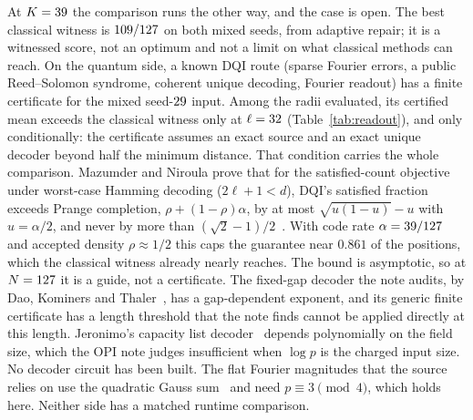 \documentclass[10pt]{article}
\begin{document}
At $K=39$ the comparison runs the other way, and the case is open. The best classical witness is $109/127$ on both mixed seeds, from adaptive repair; it is a witnessed score, not an optimum and not a limit on what classical methods can reach. On the quantum side, a known DQI route (sparse Fourier errors, a public Reed--Solomon syndrome, coherent unique decoding, Fourier readout) has a finite certificate for the mixed seed-$29$ input. Among the radii evaluated, its certified mean exceeds the classical witness only at $\ell=32$ (Table~\ref{tab:readout}), and only conditionally: the certificate assumes an exact source and an exact unique decoder beyond half the minimum distance. That condition carries the whole comparison. Mazumder and Niroula prove that for the satisfied-count objective under worst-case Hamming decoding ($2\ell+1<d$), DQI's satisfied fraction exceeds Prange completion, $\rho+(1-\rho)\alpha$, by at most $\sqrt{u(1-u)}-u$ with $u=\alpha/2$, and never by more than $(\sqrt2-1)/2$~\cite{MazumderNiroula2026}. With code rate $\alpha=39/127$ and accepted density $\rho\approx 1/2$ this caps the guarantee near $0.861$ of the positions, which the classical witness already nearly reaches. The bound is asymptotic, so at $N=127$ it is a guide, not a certificate. The fixed-gap decoder the note audits, by Dao, Kominers and Thaler~\cite{DaoKominersThaler2026}, has a gap-dependent exponent, and its generic finite certificate has a length threshold that the note finds cannot be applied directly at this length. Jeronimo's capacity list decoder~\cite{Jeronimo2026} depends polynomially on the field size, which the OPI note judges insufficient when $\log p$ is the charged input size. No decoder circuit has been built. The flat Fourier magnitudes that the source relies on use the quadratic Gauss sum~\cite{MurtyPathak2017} and need $p \equiv 3 \pmod 4$, which holds here. Neither side has a matched runtime comparison.
\end{document}
